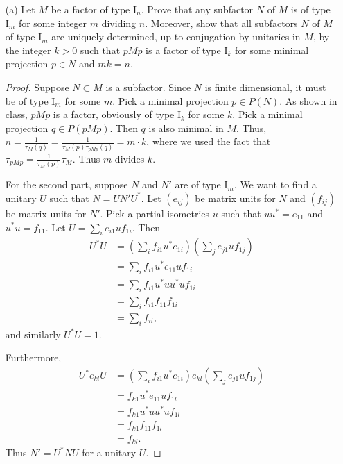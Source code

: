 \documentclass{article}
\begin{document}
\begin{enumerate}
		\item[(a)] Let $ M $ be a factor of type $ \text{I}_n $. Prove that any subfactor $ N $ of $ M $ is of type $ \text{I}_m $ for some integer $ m $ dividing $ n $. Moreover, show that all subfactors $ N $ of $ M $ of type $ \text{I}_m $ are uniquely determined, up to conjugation by unitaries in $ M $, by the integer $ k > 0 $ such that $ pMp $ is a factor of type $ \text{I}_k $ for some minimal projection $ p \in N $ and $ mk = n $.
				
	          \begin{proof}
                    Suppose $N \subset M$ is a subfactor. Since $N$ is finite dimensional, it must be of type $\text{I}_m$ for some $m$. Pick a minimal projection $p \in P(N)$.  As shown in class, $pMp$ is a factor, obviously of type I$_k$ for some $k$.  Pick a minimal projection $q \in P(pMp)$.  Then $q$ is also minimal in $M$.  Thus, $n = \frac{1}{\tau_M(q)} = \frac{1}{\tau_M(p) \tau_{pMp}(q)} = m \cdot k$, where we used the fact that $\tau_{pMp} = \frac{1}{\tau_M(p)} \tau_M$.  Thus $m$ divides $k$.

                    For the second part, suppose $N$ and $N'$ are of type I$_m$.  We want to find a unitary $U$ such that $N = U N' U^*$.  Let $(e_{ij})$ be matrix units for $N$ and $(f_{ij})$ be matrix units for $N'$.  Pick a partial isometries $u$ such that  $u u^* = e_{11}$ and $u^* u = f_{11}$.  Let $U = \sum_i e_{i1} u f_{1i}$.  Then
                    \begin{align*}
                      U^* U & = \left( \sum_i f_{i1} u^* e_{1i} \right) \left( \sum_j e_{j1} u f_{1j} \right) \\
                      & = \sum_i f_{i1} u^* e_{11} u f_{1i} \\
                      & = \sum_i f_{i1} u^* u u^* u f_{1i} \\
                      & = \sum_i f_{i1} f_{11} f_{1i} \\
                      & = \sum_i f_{ii},
                    \end{align*}
                    and similarly $U^* U = 1$.

                    Furthermore,
                    \begin{align}
                      U^* e_{kl} U & = \left( \sum_i f_{i1} u^* e_{1i} \right) e_{kl} \left( \sum_j e_{j1} u f_{1j} \right) \\
                      & = f_{k1} u^* e_{11} u f_{1l} \\
                      & = f_{k1} u^* u u^* u f_{1l} \\
                      & = f_{k1} f_{11} f_{1l} \\
                      & = f_{kl}.
                    \end{align}
                Thus $N' = U^* N U$ for a unitary $U$.                    			
		\end{proof}
		

\end{enumerate}
\end{document}
